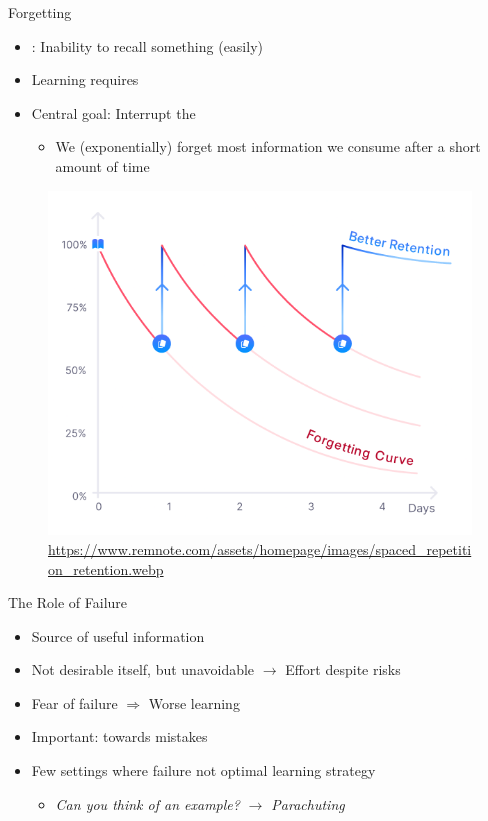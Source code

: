 \documentclass{ercisbeamer}
\begin{document}
\begin{frame}{Forgetting}
    \begin{itemize}
        \item {}: Inability to recall something (easily)
        \item Learning requires 
        \item Central goal: Interrupt the 
        \begin{itemize}
            \item We (exponentially) forget most information we consume after a short amount of time
        \end{itemize}
    \end{itemize}

    \begin{figure}
        \centering
        \includegraphics[width=0.35\paperwidth]{04_resources/forgetting_curve_remnote.png}
        \vspace{-0.5em}
        \caption{\tiny \url{https://www.remnote.com/assets/homepage/images/spaced_repetition_retention.webp}}
    \end{figure}
\end{frame}

\begin{frame}{The Role of Failure}
    \begin{itemize}
        \item Source of useful information
        \item Not desirable itself, but unavoidable $\rightarrow$ Effort despite risks
        \item Fear of failure $\Rightarrow$ Worse learning
        \item Important:  towards mistakes
        \item Few settings where failure not optimal learning strategy
        \begin{itemize}
            \item \emph{Can you think of an example?} \pause \emph{$\rightarrow$ Parachuting}
        \end{itemize}
    \end{itemize}
\end{frame}
\end{document}
